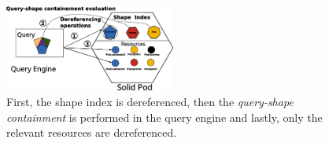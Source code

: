 \begin{figure}
    \centering
    \includegraphics[width=0.50\textwidth]{figure/shape_containement}
    \caption{First, the shape index is dereferenced, 
    then the \emph{query-shape containment} is performed in the query engine and lastly, only the relevant resources are dereferenced.}
    \label{fig:shape_index}
\end{figure}
